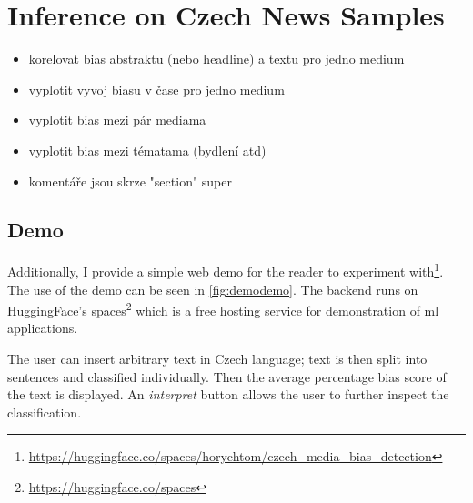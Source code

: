   

\section{Inference on Czech News Samples}\label{inference}

\begin{itemize}
    \item korelovat bias abstraktu (nebo headline) a textu pro jedno medium
    \item vyplotit vyvoj biasu v čase pro jedno medium
    \item vyplotit bias mezi pár mediama
    \item vyplotit bias mezi tématama (bydlení atd)
    \item komentáře jsou skrze "section" super
\end{itemize}

\subsection{Demo}
Additionally, I provide a simple web demo for the reader to experiment with\footnote{\url{https://huggingface.co/spaces/horychtom/czech_media_bias_detection}}. The use of the demo can be seen in \ref{fig:demodemo}. The backend runs on HuggingFace's spaces\footnote{\url{https://huggingface.co/spaces}} which is a free hosting service for demonstration of \gls{ml} applications. 

The user can insert arbitrary text in Czech language; text is then split into sentences and classified individually. Then the average percentage bias score of the text is displayed. An \textit{interpret} button allows the user to further inspect the classification.